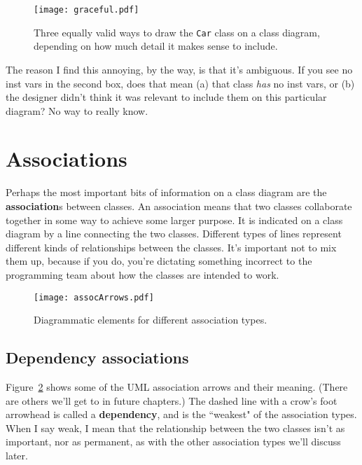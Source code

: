 \begin{figure}[ht]
\centering
\texttt{[image: graceful.pdf]}   %
\caption{Three equally valid ways to draw the \texttt{Car} class on a class
diagram, depending on how much detail it makes sense to include.}
\label{fig:graceful}
\end{figure}

The reason I find this annoying, by the way, is that it's ambiguous. If you
see no inst vars in the second box, does that mean (a) that class \textit{has}
no inst vars, or (b) the designer didn't think it was relevant to include them
on this particular diagram? No way to really know.

\section{Associations}

Perhaps the most important bits of information on a class diagram are the
\textbf{association}s between classes. An association means that two classes
collaborate together in some way to achieve some larger purpose. It is
indicated on a class diagram by a line connecting the two classes. Different
types of lines represent different kinds of relationships between the classes.
It's important not to mix them up, because if you do, you're dictating
something incorrect to the programming team about how the classes are intended
to work.

\begin{figure}[ht]
\centering
\texttt{[image: assocArrows.pdf]}   %
\vspace{.2in}
\caption{Diagrammatic elements for different association types.}
\label{fig:assocArrows}
\end{figure}

\subsection{Dependency associations}

Figure~\ref{fig:assocArrows} shows some of the UML association arrows and
their meaning. (There are others we'll get to in future chapters.) The dashed
line with a crow's foot arrowhead is called a \textbf{dependency}, and is the
``weakest" of the association types. When I say weak, I mean that the
relationship between the two classes isn't as important, nor as permanent, as
with the other association types we'll discuss later.

